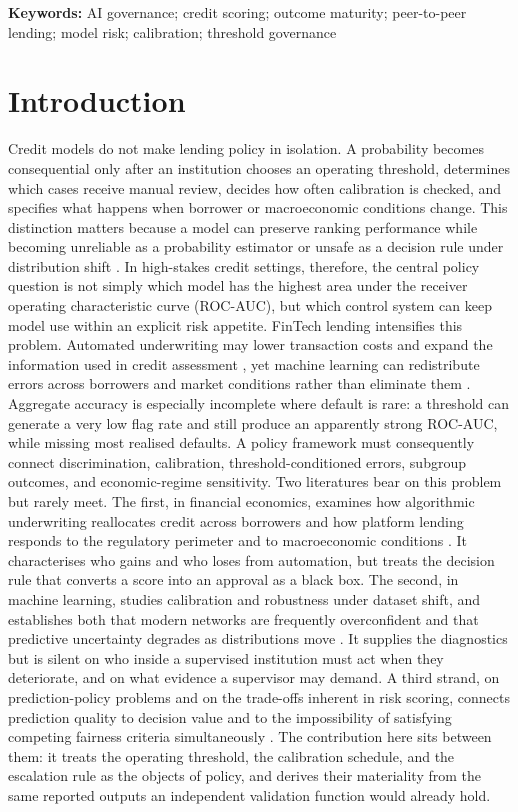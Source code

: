 \documentclass[10pt]{article}
\begin{document}
\noindent\textbf{Keywords:} AI governance; credit scoring; outcome maturity; peer-to-peer lending; model risk; calibration; threshold governance

\section{Introduction}

Credit models do not make lending policy in isolation. A probability becomes consequential only after an institution chooses an operating threshold, determines which cases receive manual review, decides how often calibration is checked, and specifies what happens when borrower or macroeconomic conditions change. This distinction matters because a model can preserve ranking performance while becoming unreliable as a probability estimator or unsafe as a decision rule under distribution shift \cite{ref18,ref26,ref30,ref34}. In high-stakes credit settings, therefore, the central policy question is not simply which model has the highest area under the receiver operating characteristic curve (ROC-AUC), but which control system can keep model use within an explicit risk appetite. FinTech lending intensifies this problem. Automated underwriting may lower transaction costs and expand the information used in credit assessment \cite{ref1,ref13,ref17}, yet machine learning can redistribute errors across borrowers and market conditions rather than eliminate them \cite{ref2,ref7,ref8}. Aggregate accuracy is especially incomplete where default is rare: a threshold can generate a very low flag rate and still produce an apparently strong ROC-AUC, while missing most realised defaults. A policy framework must consequently connect discrimination, calibration, threshold-conditioned errors, subgroup outcomes, and economic-regime sensitivity. Two literatures bear on this problem but rarely meet. The first, in financial economics, examines how algorithmic underwriting reallocates credit across borrowers and how platform lending responds to the regulatory perimeter and to macroeconomic conditions \cite{ref1,ref2,ref13,ref17}. It characterises who gains and who loses from automation, but treats the decision rule that converts a score into an approval as a black box. The second, in machine learning, studies calibration and robustness under dataset shift, and establishes both that modern networks are frequently overconfident and that predictive uncertainty degrades as distributions move \cite{ref29,ref30,ref34}. It supplies the diagnostics but is silent on who inside a supervised institution must act when they deteriorate, and on what evidence a supervisor may demand. A third strand, on prediction-policy problems and on the trade-offs inherent in risk scoring, connects prediction quality to decision value and to the impossibility of satisfying competing fairness criteria simultaneously \cite{ref7,ref8,ref18,ref19}. The contribution here sits between them: it treats the operating threshold, the calibration schedule, and the escalation rule as the objects of policy, and derives their materiality from the same reported outputs an independent validation function would already hold. 
\end{document}
